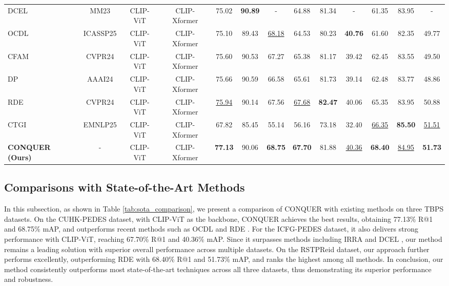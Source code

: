 \documentclass{article}
\begin{document}
\begin{table}[!t]
{\begin{tabular}{l|ccc|ccc|ccc|ccc}
DCEL \cite{19} & MM23 & CLIP-ViT & CLIP-Xformer & 75.02 & \textbf{90.89} & - & 64.88 & 81.34 & - & 61.35 & {83.95} & - \\
OCDL \cite{20} & ICASSP25 & CLIP-ViT & CLIP-Xformer & 75.10 & 89.43 & \underline{68.18} & 64.53 & 80.23 & \textbf{40.76} & 61.60 & 82.35 & 49.77 \\
CFAM \cite{5} & CVPR24 & CLIP-ViT & CLIP-Xformer & 75.60 & 90.53 & 67.27 & 65.38 & 81.17 & 39.42 & 62.45 & 83.55 & 49.50 \\
DP \cite{21} & AAAI24 & CLIP-ViT & CLIP-Xformer & 75.66 & 90.59 & 66.58 & 65.61 & 81.73 & 39.14 & 62.48 & 83.77 & 48.86 \\
RDE \cite{22} & CVPR24 & CLIP-ViT & CLIP-Xformer & \underline{75.94} & 90.14 & 67.56 & \underline{67.68} & \textbf{82.47} & 40.06 & {65.35} & 83.95& {50.88} \\
CTGI \cite{xie2025chat} & EMNLP25 & CLIP-ViT & CLIP-Xformer & 67.82 & 85.45 &  55.14 & 56.16& 73.18 & 32.40 & \underline{66.35} & \textbf{85.50}& \underline{51.51} \\
\hline
\textbf{CONQUER (Ours)} & - & CLIP-ViT & CLIP-Xformer & \textbf{77.13} & 90.06 & \textbf{68.75} & \textbf{67.70} & 81.88 & \underline{40.36} & \textbf{68.40} & \underline{84.95} & \textbf{51.73} \\
\bottomrule
\end{tabular}%
}
\end{table}



\subsection{ Comparisons with State-of-the-Art Methods}

In this subsection, as shown in Table \ref{tab:sota_comparison}, we present a comparison of CONQUER with existing methods on three TBPS datasets. On the CUHK-PEDES dataset, with CLIP-ViT as the backbone, CONQUER achieves the best results, obtaining 77.13\% R@1 and 68.75\% mAP, and outperforms recent methods such as OCDL \cite{20} and RDE \cite{22}. For the ICFG-PEDES dataset, it also delivers strong performance with CLIP-ViT, reaching 67.70\% R@1 and 40.36\% mAP. Since it surpasses methods including IRRA \cite{3} and DCEL \cite{19}, our method remains a leading solution with superior overall performance across multiple datasets. On the RSTPReid dataset, our approach further performs excellently, outperforming RDE \cite{22} with 68.40\% R@1 and 51.73\% mAP, and ranks the highest among all methods. In conclusion, our method consistently outperforms most state-of-the-art techniques across all three datasets, thus demonstrating its superior performance and robustness.
\end{document}
